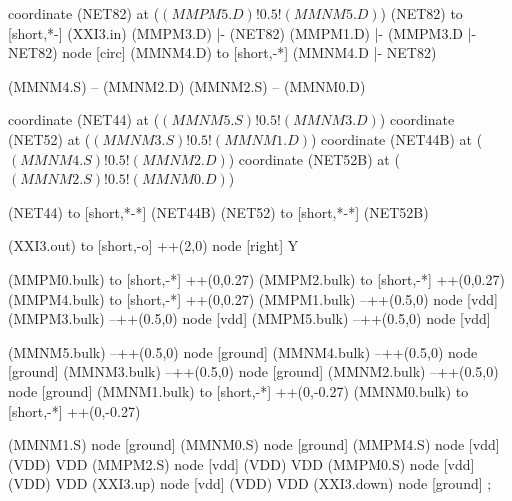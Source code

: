 \begin{circuitikz}[american]
	coordinate (NET82) at ($(MMPM5.D)!0.5!(MMNM5.D)$)
	(NET82) to [short,*-] (XXI3.in)
	(MMPM3.D) |- (NET82) 
	(MMPM1.D) |- (MMPM3.D |- NET82) node [circ] {}
	(MMNM4.D) to [short,-*] (MMNM4.D |- NET82) 
	
	(MMNM4.S) -- (MMNM2.D)
	(MMNM2.S) -- (MMNM0.D)
	
	coordinate (NET44) at ($(MMNM5.S)!0.5!(MMNM3.D)$)
	coordinate (NET52) at ($(MMNM3.S)!0.5!(MMNM1.D)$)
	coordinate (NET44B) at ($(MMNM4.S)!0.5!(MMNM2.D)$)
	coordinate (NET52B) at ($(MMNM2.S)!0.5!(MMNM0.D)$)
	
	(NET44) to [short,*-*] (NET44B)
	(NET52) to [short,*-*] (NET52B)	
	
	(XXI3.out) to [short,-o] ++(2,0) node [right] {Y}
	
	(MMPM0.bulk) to [short,-*] ++(0,0.27)
	(MMPM2.bulk) to [short,-*] ++(0,0.27)	
	(MMPM4.bulk) to [short,-*] ++(0,0.27)	
	(MMPM1.bulk) --++(0.5,0) node [vdd]{}
	(MMPM3.bulk) --++(0.5,0) node [vdd]{}
	(MMPM5.bulk) --++(0.5,0) node [vdd]{}
	
	
	(MMNM5.bulk) --++(0.5,0) node [ground]{}
	(MMNM4.bulk) --++(0.5,0) node [ground]{}
	(MMNM3.bulk) --++(0.5,0) node [ground]{}
	(MMNM2.bulk) --++(0.5,0) node [ground]{}
	(MMNM1.bulk) to [short,-*] ++(0,-0.27)
	(MMNM0.bulk) to [short,-*] ++(0,-0.27)
	

	(MMNM1.S) node [ground] {}
	(MMNM0.S) node [ground] {}
	(MMPM4.S) node [vdd] (VDD) {VDD}
	(MMPM2.S) node [vdd] (VDD) {VDD}
	(MMPM0.S) node [vdd] (VDD) {VDD}
	(XXI3.up) node [vdd] (VDD) {VDD}
	(XXI3.down) node [ground] {}
;

\end{circuitikz}
